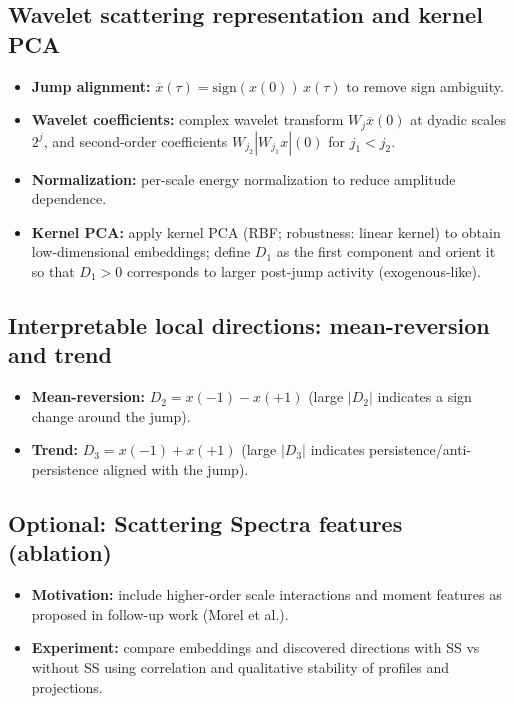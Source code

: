 \documentclass[11pt]{article}
\begin{document}
\subsection*{Wavelet scattering representation and kernel PCA}
\begin{itemize}
    \item \textbf{Jump alignment:} $\overline{x}(\tau)=\mathrm{sign}(x(0))\,x(\tau)$ to remove sign ambiguity. 
    \item \textbf{Wavelet coefficients:} complex wavelet transform $W_j\overline{x}(0)$ at dyadic scales $2^j$, and second-order coefficients $W_{j_2}|W_{j_1}x|(0)$ for $j_1<j_2$. 
    \item \textbf{Normalization:} per-scale energy normalization to reduce amplitude dependence. 
    \item \textbf{Kernel PCA:} apply kernel PCA (RBF; robustness: linear kernel) to obtain low-dimensional embeddings; define $D_1$ as the first component and orient it so that $D_1>0$ corresponds to larger post-jump activity (exogenous-like). 
\end{itemize}

\subsection*{Interpretable local directions: mean-reversion and trend}
\begin{itemize}
    \item \textbf{Mean-reversion:} $D_2 = x(-1)-x(+1)$ (large $|D_2|$ indicates a sign change around the jump). 
    \item \textbf{Trend:} $D_3 = x(-1)+x(+1)$ (large $|D_3|$ indicates persistence/anti-persistence aligned with the jump). 
\end{itemize}

\subsection*{Optional: Scattering Spectra features (ablation)}
\begin{itemize}
    \item \textbf{Motivation:} include higher-order scale interactions and moment features as proposed in follow-up work (Morel et al.). 
    \item \textbf{Experiment:} compare embeddings and discovered directions with SS vs without SS using correlation and qualitative stability of profiles and projections. 
\end{itemize}
\end{document}
